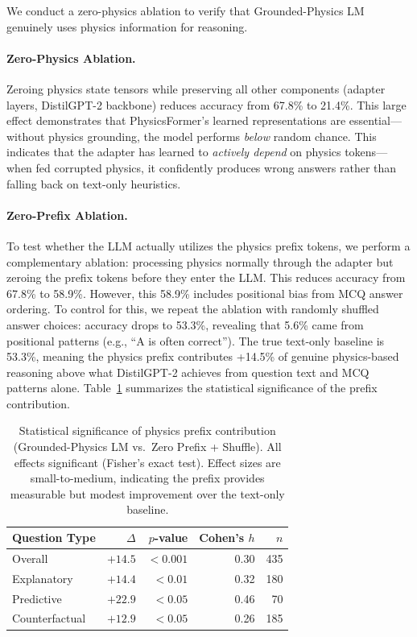 \documentclass[conference]{IEEEtran}
\theoremstyle{plain}
\theoremstyle{definition}
\theoremstyle{remark}
\begin{document}
We conduct a zero-physics ablation to verify that Grounded-Physics LM genuinely uses physics information for reasoning.

\paragraph{Zero-Physics Ablation.} Zeroing physics state tensors while preserving all other components (adapter layers, DistilGPT-2 backbone) reduces accuracy from 67.8\% to 21.4\%. This large effect demonstrates that PhysicsFormer's learned representations are essential---without physics grounding, the model performs \emph{below} random chance. This indicates that the adapter has learned to \emph{actively depend} on physics tokens---when fed corrupted physics, it confidently produces wrong answers rather than falling back on text-only heuristics.

\paragraph{Zero-Prefix Ablation.} To test whether the LLM actually utilizes the physics prefix tokens, we perform a complementary ablation: processing physics normally through the adapter but zeroing the prefix tokens before they enter the LLM. This reduces accuracy from 67.8\% to 58.9\%. However, this 58.9\% includes positional bias from MCQ answer ordering. To control for this, we repeat the ablation with randomly shuffled answer choices: accuracy drops to 53.3\%, revealing that 5.6\% came from positional patterns (e.g., ``A is often correct''). The true text-only baseline is 53.3\%, meaning the physics prefix contributes +14.5\% of genuine physics-based reasoning above what DistilGPT-2 achieves from question text and MCQ patterns alone. Table~\ref{tab:prefix_significance} summarizes the statistical significance of the prefix contribution.

\begin{table}[h]
\centering
\footnotesize
\begin{tabular*}{\columnwidth}{@{\extracolsep{\fill}}lrrrr@{}}
\toprule
\textbf{Question Type} & \textbf{$\Delta$} & \textbf{$p$-value} & \textbf{Cohen's $h$} & \textbf{$n$} \\
\midrule
Overall & $+14.5$ & $<0.001$ & 0.30 & 435 \\
Explanatory & $+14.4$ & $<0.01$ & 0.32 & 180 \\
Predictive & $+22.9$ & $<0.05$ & 0.46 & 70 \\
Counterfactual & $+12.9$ & $<0.05$ & 0.26 & 185 \\
\bottomrule
\end{tabular*}
\caption{Statistical significance of physics prefix contribution (Grounded-Physics LM vs.\ Zero Prefix + Shuffle). All effects significant (Fisher's exact test). Effect sizes are small-to-medium, indicating the prefix provides measurable but modest improvement over the text-only baseline.}
\label{tab:prefix_significance}
\end{table}
\end{document}
